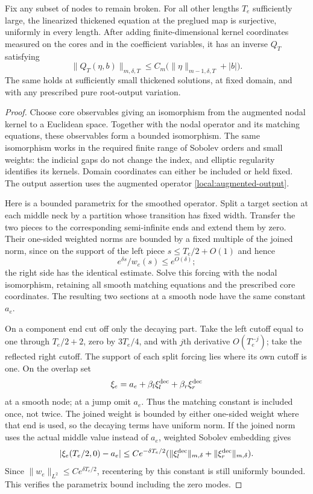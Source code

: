 \begin{lemma}\label{local:inverse}
Fix any subset of nodes to remain broken.  For all other lengths
$T_e$ sufficiently large, the linearized thickened equation at the
preglued map is surjective, uniformly in every length.  After adding
finite-dimensional kernel coordinates measured on the cores and in
the coefficient variables, it has an inverse $Q_T$ satisfying
\begin{equation}\label{local:inverse-estimate}
 \|Q_T(\eta,b)\|_{m,\delta,T}
       \leq C_m\bigl(\|\eta\|_{m-1,\delta,T}+|b|\bigr).
\end{equation}
The same holds at sufficiently small thickened solutions, at fixed
domain, and with any prescribed pure root-output variation.
\end{lemma}
\begin{proof}
Choose core observables giving an isomorphism from the augmented nodal
kernel to a Euclidean space.  Together with the nodal operator and its
matching equations, these observables form a bounded isomorphism.
The same isomorphism works in the required finite range of Sobolev
orders and small weights: the indicial gaps do not change the index,
and elliptic regularity identifies its kernels.  Domain coordinates
can either be included or held fixed.  The output assertion uses the
augmented operator \eqref{local:augmented-output}.

Here is a bounded parametrix for the smoothed operator.  Split a target
section at each middle neck by a partition whose transition has fixed
width.  Transfer the two pieces to the corresponding semi-infinite
ends and extend them by zero.  Their one-sided weighted norms are
bounded by a fixed multiple of the joined norm, since on the support
of the left piece $s\leq T_e/2+O(1)$ and hence
\[
 e^{\delta s}/w_e(s)\leq e^{O(\delta)};
\]
the right side has the identical estimate.  Solve this forcing with
the nodal isomorphism, retaining all smooth matching equations and
the prescribed core coordinates.  The resulting two sections at a
smooth node have the same constant $a_e$.

On a component end cut off only the decaying part.  Take the left
cutoff equal to one through $T_e/2+2$, zero by $3T_e/4$, and with
$j$th derivative $O(T_e^{-j})$; take the reflected right cutoff.
The support of each split forcing lies where its own cutoff is one.
On the overlap set
\begin{equation}\label{local:splice}
 \xi_e=a_e+\beta_l\xi_l^{\rm dec}
                  +\beta_r\xi_r^{\rm dec}
\end{equation}
at a smooth node; at a jump omit $a_e$.  Thus the matching constant
is included once, not twice.  The joined weight is bounded by either
one-sided weight where that end is used, so the decaying terms have
uniform norm.  If the joined norm uses the actual middle value
instead of $a_e$, weighted Sobolev embedding gives
\[
 |\xi_e(T_e/2,0)-a_e|
       \leq C e^{-\delta T_e/2}
                (\|\xi_l^{\rm dec}\|_{m,\delta}
                 +\|\xi_r^{\rm dec}\|_{m,\delta}).
\]
Since $\|w_e\|_{L^2}\leq Ce^{\delta T_e/2}$, recentering by this
constant is still uniformly bounded.  This verifies the parametrix
bound including the zero modes.


\end{proof}
